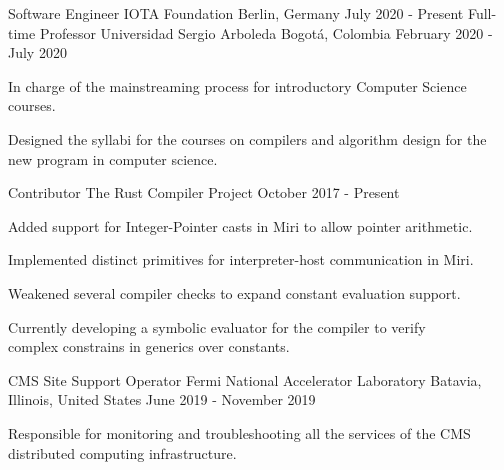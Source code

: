 


\begin{cventries}
    \cventry
    {Software Engineer}
    {IOTA Foundation}
    {Berlin, Germany}
    {July 2020 - Present}
    {
    }
    \cventry
    {Full-time Professor}
    {Universidad Sergio Arboleda}
    {Bogotá, Colombia}
    {February 2020 - July 2020}
    {
        \begin{cvitems}
        \item In charge of the mainstreaming process for introductory Computer Science courses.
        \item Designed the syllabi for the courses on compilers and algorithm design for the new program in computer science.
        \end{cvitems}
    }
    \cventry
    {Contributor}
    {The Rust Compiler Project}
    {}
    {October 2017 - Present}
    {
        \begin{cvitems}
        \item Added support for Integer-Pointer casts in Miri to allow pointer arithmetic.
        \item Implemented distinct primitives for interpreter-host communication in Miri.
        \item Weakened several compiler checks to expand constant evaluation support.
        \item Currently developing a symbolic evaluator for the compiler to verify\\ complex constrains in generics over constants.
        \end{cvitems}
    }
    \cventry
    {CMS Site Support Operator}
    {Fermi National Accelerator Laboratory}
    {Batavia, Illinois, United States}
    {June 2019 - November 2019}
    {
        \begin{cvitems}
        \item{Responsible for monitoring and troubleshooting all the services of the CMS distributed computing infrastructure.}
        \end{cvitems}
    }


\end{cventries}
